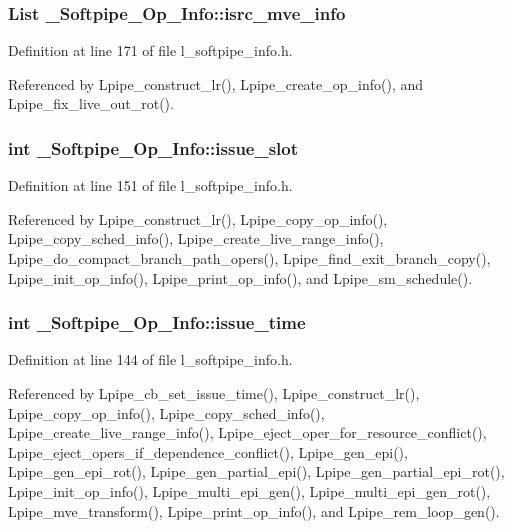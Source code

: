 \subsubsection{\setlength{\rightskip}{0pt plus 5cm}List \bf{\_\-Softpipe\_\-Op\_\-Info::isrc\_\-mve\_\-info}}\label{struct__Softpipe__Op__Info_7207512787d15f20544a489a9e7d6c2d}




Definition at line 171 of file l\_\-softpipe\_\-info.h.

Referenced by Lpipe\_\-construct\_\-lr(), Lpipe\_\-create\_\-op\_\-info(), and Lpipe\_\-fix\_\-live\_\-out\_\-rot().
\subsubsection{\setlength{\rightskip}{0pt plus 5cm}int \bf{\_\-Softpipe\_\-Op\_\-Info::issue\_\-slot}}\label{struct__Softpipe__Op__Info_020d2854e972ae85a214b3012f8e023e}




Definition at line 151 of file l\_\-softpipe\_\-info.h.

Referenced by Lpipe\_\-construct\_\-lr(), Lpipe\_\-copy\_\-op\_\-info(), Lpipe\_\-copy\_\-sched\_\-info(), Lpipe\_\-create\_\-live\_\-range\_\-info(), Lpipe\_\-do\_\-compact\_\-branch\_\-path\_\-opers(), Lpipe\_\-find\_\-exit\_\-branch\_\-copy(), Lpipe\_\-init\_\-op\_\-info(), Lpipe\_\-print\_\-op\_\-info(), and Lpipe\_\-sm\_\-schedule().
\subsubsection{\setlength{\rightskip}{0pt plus 5cm}int \bf{\_\-Softpipe\_\-Op\_\-Info::issue\_\-time}}\label{struct__Softpipe__Op__Info_f69da927376f1a1b3c0b3fc0ed76fb65}




Definition at line 144 of file l\_\-softpipe\_\-info.h.

Referenced by Lpipe\_\-cb\_\-set\_\-issue\_\-time(), Lpipe\_\-construct\_\-lr(), Lpipe\_\-copy\_\-op\_\-info(), Lpipe\_\-copy\_\-sched\_\-info(), Lpipe\_\-create\_\-live\_\-range\_\-info(), Lpipe\_\-eject\_\-oper\_\-for\_\-resource\_\-conflict(), Lpipe\_\-eject\_\-opers\_\-if\_\-dependence\_\-conflict(), Lpipe\_\-gen\_\-epi(), Lpipe\_\-gen\_\-epi\_\-rot(), Lpipe\_\-gen\_\-partial\_\-epi(), Lpipe\_\-gen\_\-partial\_\-epi\_\-rot(), Lpipe\_\-init\_\-op\_\-info(), Lpipe\_\-multi\_\-epi\_\-gen(), Lpipe\_\-multi\_\-epi\_\-gen\_\-rot(), Lpipe\_\-mve\_\-transform(), Lpipe\_\-print\_\-op\_\-info(), and Lpipe\_\-rem\_\-loop\_\-gen().
